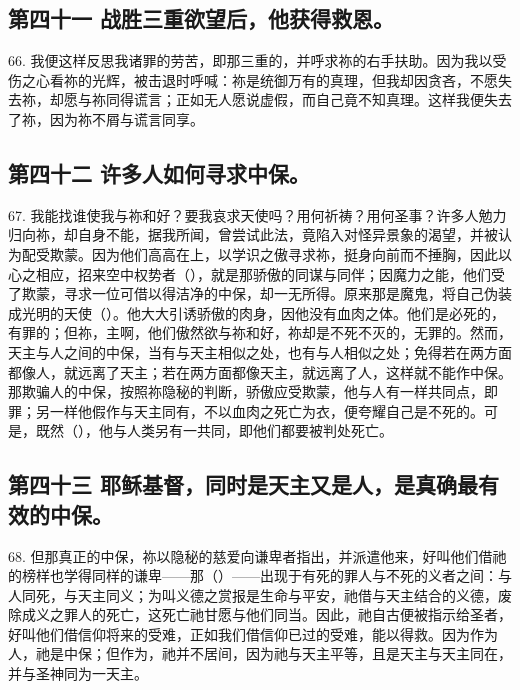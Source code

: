 \subsection{第四十一 战胜三重欲望后，他获得救恩。}

66. 我便这样反思我诸罪的劳苦，即那三重的，并呼求祢的右手扶助。因为我以受伤之心看祢的光辉，被击退时呼喊：祢是统御万有的真理，但我却因贪吝，不愿失去祢，却愿与祢同得谎言；正如无人愿说虚假，而自己竟不知真理。这样我便失去了祢，因为祢不屑与谎言同享。\par


\subsection{第四十二 许多人如何寻求中保。}

67. 我能找谁使我与祢和好？要我哀求天使吗？用何祈祷？用何圣事？许多人勉力归向祢，却自身不能，据我所闻，曾尝试此法，竟陷入对怪异景象的渴望，并被认为配受欺蒙。因为他们高高在上，以学识之傲寻求祢，挺身向前而不捶胸，因此以心之相应，招来空中权势者（），就是那骄傲的同谋与同伴；因魔力之能，他们受了欺蒙，寻求一位可借以得洁净的中保，却一无所得。原来那是魔鬼，将自己伪装成光明的天使（）。他大大引诱骄傲的肉身，因他没有血肉之体。他们是必死的，有罪的；但祢，主啊，他们傲然欲与祢和好，祢却是不死不灭的，无罪的。然而，天主与人之间的中保，当有与天主相似之处，也有与人相似之处；免得若在两方面都像人，就远离了天主；若在两方面都像天主，就远离了人，这样就不能作中保。那欺骗人的中保，按照祢隐秘的判断，骄傲应受欺蒙，他与人有一样共同点，即罪；另一样他假作与天主同有，不以血肉之死亡为衣，便夸耀自己是不死的。可是，既然（），他与人类另有一共同，即他们都要被判处死亡。\par


\subsection{第四十三 耶稣基督，同时是天主又是人，是真确最有效的中保。}

68. 但那真正的中保，祢以隐秘的慈爱向谦卑者指出，并派遣他来，好叫他们借祂的榜样也学得同样的谦卑——那（）——出现于有死的罪人与不死的义者之间：与人同死，与天主同义；为叫义德之赏报是生命与平安，祂借与天主结合的义德，废除成义之罪人的死亡，这死亡祂甘愿与他们同当。因此，祂自古便被指示给圣者，好叫他们借信仰将来的受难，正如我们借信仰已过的受难，能以得救。因为作为人，祂是中保；但作为，祂并不居间，因为祂与天主平等，且是天主与天主同在，并与圣神同为一天主。\par

